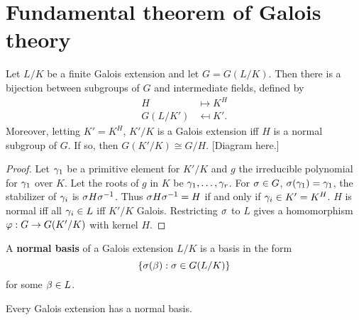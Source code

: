 \section{Fundamental theorem of Galois theory}
\begin{thm}\label{ftogt}
Let $L/K$ be a finite Galois extension and let $G=G(L/K)$. Then there is a bijection between subgroups of $G$ and intermediate fields, defined by
\begin{align*}
H&\mapsto K^H\\
G(L/K')&\mapsfrom K'.
\end{align*}
Moreover, letting $K'=K^H$, $K'/K$ is a Galois extension iff $H$ is a normal subgroup of $G$. If so, then $G(K'/K)\cong G/H$. [Diagram here.]
\end{thm}
\begin{proof}
Let $\gamma_1$ be a primitive element for $K'/K$ and $g$ the irreducible polynomial for $\gamma_1$ over $K$. Let the roots of $g$ in $K$ be $\gamma_1,\ldots, \gamma_r$. For $\sigma\in G$, $\sigma(\gamma_1)=\gamma_1$, the stabilizer of $\gamma_i$ is $\sigma H\sigma^{-1}$. Thus $\sigma H \sigma^{-1}=H$ if and only if $\gamma_i\in K'=K^H$. $H$ is normal iff all $\gamma_i\in L$ iff $K'/K$ Galois. Restricting $\sigma$ to $L$ gives  a homomorphism $\varphi:G\to G(K'/K)$ with kernel $H$.
\end{proof}
\begin{df}
A \textbf{normal basis} of a Galois extension $L/K$ is a basis in the form
\[
\left\{{\sigma(\beta)}:{\sigma\in G(L/K)}\right\}
\]
for some $\beta\in L$.
\end{df}
\begin{thm}\label{nbt}
Every Galois extension has a normal basis.
\end{thm}
